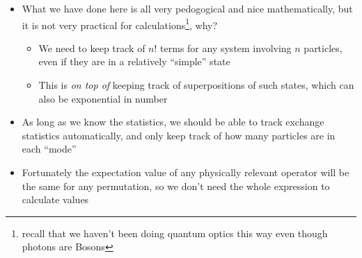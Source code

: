 \documentclass[english]{article}
\begin{document}
\begin{itemize}
\item What we have done here is all very pedogogical and nice mathematically, but it is not very practical for calculations\footnote{recall that we haven't been doing quantum optics this way even though photons are Bosons}, why? 
\begin{itemize}
\item We need to keep track of $n!$ terms for any system involving $n$ particles, even if they are in a relatively ``simple'' state
\item This is \emph{on top of} keeping track of superpositions of such states, which can also be exponential in number
\end{itemize}
\item As long as we know the statistics, we should be able to track exchange statistics automatically, and only keep track of how many particles are in each ``mode''
\item Fortunately the expectation value of any physically relevant operator will be the same for any permutation, so we don't need the whole expression to calculate values

\end{itemize}
\end{document}
